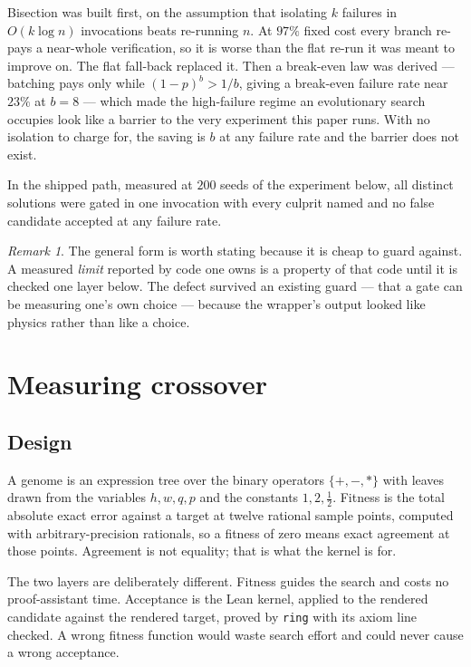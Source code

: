 \documentclass[11pt,a4paper]{article}
\theoremstyle{definition}
\theoremstyle{remark}
\newtheorem{remark}{Remark}[section]
\begin{document}
Bisection was built first, on the assumption that isolating $k$ failures in
$O(k\log n)$ invocations beats re-running $n$. At $97\%$ fixed cost every branch
re-pays a near-whole verification, so it is worse than the flat re-run it was
meant to improve on. The flat fall-back replaced it. Then a break-even law was
derived --- batching pays only while $(1-p)^b > 1/b$, giving a break-even
failure rate near $23\%$ at $b=8$ --- which made the high-failure regime an
evolutionary search occupies look like a barrier to the very experiment this
paper runs. With no isolation to charge for, the saving is $b$ at any failure
rate and the barrier does not exist.

In the shipped path, measured at $200$ seeds of the experiment below, all
distinct solutions were gated in one invocation with every culprit named and no
false candidate accepted at any failure rate.

\begin{remark}
The general form is worth stating because it is cheap to guard against. A
measured \emph{limit} reported by code one owns is a property of that code until
it is checked one layer below. The defect survived an existing guard --- that a
gate can be measuring one's own choice --- because the wrapper's output looked
like physics rather than like a choice.
\end{remark}

\section{Measuring crossover}\label{sec:measurement}

\subsection{Design}

A genome is an expression tree over the binary operators $\{+,-,*\}$ with leaves
drawn from the variables $h,w,q,p$ and the constants $1, 2, \tfrac12$. Fitness is
the total absolute exact error against a target at twelve rational sample points,
computed with arbitrary-precision rationals, so a fitness of zero means exact
agreement at those points. Agreement is not equality; that is what the kernel is
for.

The two layers are deliberately different. Fitness guides the search and costs no
proof-assistant time. Acceptance is the Lean kernel, applied to the rendered
candidate against the rendered target, proved by \texttt{ring} with its axiom
line checked. A wrong fitness function would waste search effort and could never
cause a wrong acceptance.
\end{document}
